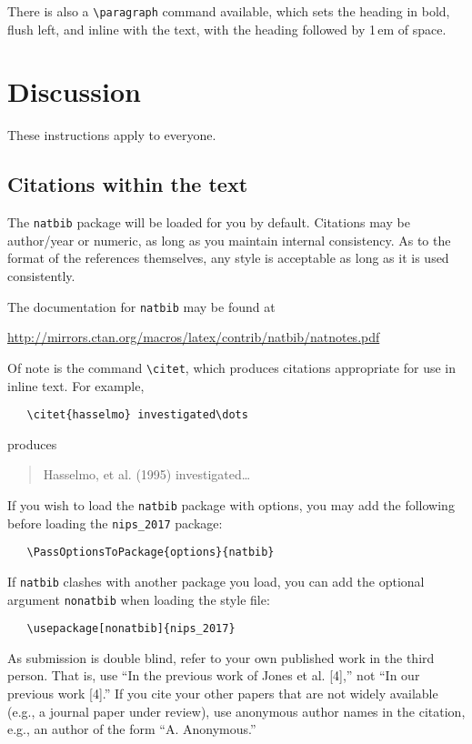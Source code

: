 \documentclass{article}
\begin{document}
There is also a \verb+\paragraph+ command available, which sets the
heading in bold, flush left, and inline with the text, with the
heading followed by 1\,em of space.

\section{Discussion}
\label{discussion}

These instructions apply to everyone.

\subsection{Citations within the text}

The \verb+natbib+ package will be loaded for you by default.
Citations may be author/year or numeric, as long as you maintain
internal consistency.  As to the format of the references themselves,
any style is acceptable as long as it is used consistently.

The documentation for \verb+natbib+ may be found at
\begin{center}
  \url{http://mirrors.ctan.org/macros/latex/contrib/natbib/natnotes.pdf}
\end{center}
Of note is the command \verb+\citet+, which produces citations
appropriate for use in inline text.  For example,
\begin{verbatim}
   \citet{hasselmo} investigated\dots
\end{verbatim}
produces
\begin{quote}
  Hasselmo, et al. (1995) investigated\dots
\end{quote}

If you wish to load the \verb+natbib+ package with options, you may
add the following before loading the \verb+nips_2017+ package:
\begin{verbatim}
   \PassOptionsToPackage{options}{natbib}
\end{verbatim}

If \verb+natbib+ clashes with another package you load, you can add
the optional argument \verb+nonatbib+ when loading the style file:
\begin{verbatim}
   \usepackage[nonatbib]{nips_2017}
\end{verbatim}

As submission is double blind, refer to your own published work in the
third person. That is, use ``In the previous work of Jones et
al. [4],'' not ``In our previous work [4].'' If you cite your other
papers that are not widely available (e.g., a journal paper under
review), use anonymous author names in the citation, e.g., an author
of the form ``A. Anonymous.''
\end{document}
